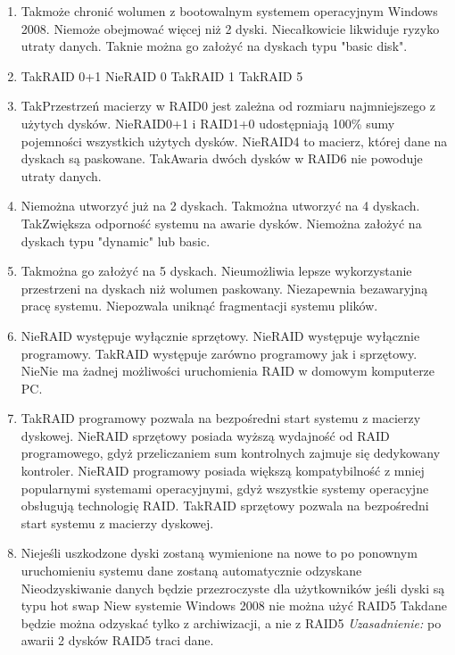 \begin{enumerate}
		{Nie}{konfiguracja typu stripped volume}%
		{Tak}{konfiguracja typu RAID 5}%
		{Tak}{konfiguracja typu mirror}%
		{Nie}{konfiguracja typu spanned volume}
		\item {}%
		{Tak}{może chronić wolumen z bootowalnym systemem operacyjnym Windows 2008.}%
		{Nie}{może obejmować więcej niż 2 dyski.}%
		{Nie}{całkowicie likwiduje ryzyko utraty danych.}%
		{Tak}{nie można go założyć na dyskach typu "basic disk".}
		\item {}%
		{Tak}{RAID 0+1}%
		{Nie}{RAID 0}%
		{Tak}{RAID 1}%
		{Tak}{RAID 5}
		\item {}%
		{Tak}{Przestrzeń macierzy w RAID0 jest zależna od rozmiaru najmniejszego z użytych dysków.}%
		{Nie}{RAID0+1 i RAID1+0 udostępniają 100\% sumy pojemności wszystkich użytych dysków.}%
		{Nie}{RAID4 to macierz, której dane na dyskach są paskowane.}%
		{Tak}{Awaria dwóch dysków w RAID6 nie powoduje utraty danych.}
		\item {}%
		{Nie}{można utworzyć już na 2 dyskach.}%
		{Tak}{można utworzyć na 4 dyskach.}%
		{Tak}{Zwiększa odporność systemu na awarie dysków.}%
		{Nie}{można założyć na dyskach typu "dynamic" lub basic.}
		\item {}%
		{Tak}{można go założyć na 5 dyskach.}%
		{Nie}{umożliwia lepsze wykorzystanie przestrzeni na dyskach niż wolumen paskowany.}%
		{Nie}{zapewnia bezawaryjną pracę systemu.}%
		{Nie}{pozwala uniknąć fragmentacji systemu plików.}
		\item {}%
		{Nie}{RAID występuje wyłącznie sprzętowy.}%
		{Nie}{RAID występuje wyłącznie programowy.}%
		{Tak}{RAID występuje zarówno programowy jak i sprzętowy.}%
		{Nie}{Nie ma żadnej możliwości uruchomienia RAID w domowym komputerze PC.}
		\item {}%
		{Tak}{RAID programowy pozwala na bezpośredni start systemu z macierzy dyskowej.}%
		{Nie}{RAID sprzętowy posiada wyższą wydajność od RAID programowego, gdyż przeliczaniem sum kontrolnych zajmuje się dedykowany kontroler.}%
		{Nie}{RAID programowy posiada większą kompatybilność z mniej popularnymi systemami operacyjnymi, gdyż wszystkie systemy operacyjne obsługują technologię RAID.}%
		{Tak}{RAID sprzętowy pozwala na bezpośredni start systemu z macierzy dyskowej.}
		\item {}
		{Nie}{jeśli uszkodzone dyski zostaną wymienione na nowe to po ponownym uruchomieniu systemu dane zostaną automatycznie odzyskane}
		{Nie}{odzyskiwanie danych będzie przezroczyste dla użytkowników jeśli dyski są typu hot swap}
		{Nie}{w systemie Windows 2008 nie można użyć RAID5}
		{Tak}{dane będzie można odzyskać tylko z archiwizacji, a nie z RAID5}
		{\small \emph{Uzasadnienie:} po awarii 2 dysków RAID5 traci dane.}
		
	\end{enumerate}